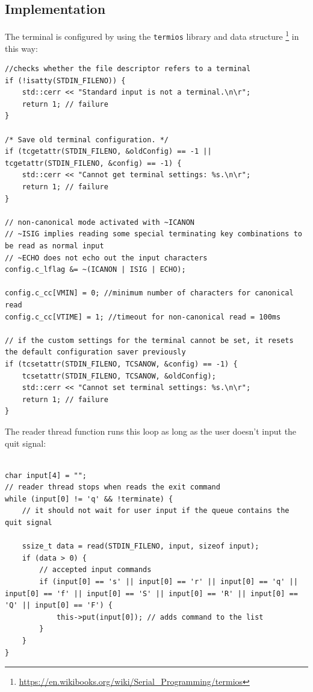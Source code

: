 \documentclass[10pt]{article}
\begin{document}
    \subsection{Implementation}
    The terminal is configured by using the \verb|termios| library and data structure \footnote{\url{https://en.wikibooks.org/wiki/Serial\_Programming/termios}} in this way:
    \begin{verbatim}
//checks whether the file descriptor refers to a terminal
if (!isatty(STDIN_FILENO)) {
	std::cerr << "Standard input is not a terminal.\n\r";
	return 1; // failure
}

/* Save old terminal configuration. */
if (tcgetattr(STDIN_FILENO, &oldConfig) == -1 || tcgetattr(STDIN_FILENO, &config) == -1) {
	std::cerr << "Cannot get terminal settings: %s.\n\r";
	return 1; // failure
}

// non-canonical mode activated with ~ICANON
// ~ISIG implies reading some special terminating key combinations to be read as normal input
// ~ECHO does not echo out the input characters
config.c_lflag &= ~(ICANON | ISIG | ECHO);

config.c_cc[VMIN] = 0; //minimum number of characters for canonical read
config.c_cc[VTIME] = 1; //timeout for non-canonical read = 100ms

// if the custom settings for the terminal cannot be set, it resets the default configuration saver previously
if (tcsetattr(STDIN_FILENO, TCSANOW, &config) == -1) {
	tcsetattr(STDIN_FILENO, TCSANOW, &oldConfig);
	std::cerr << "Cannot set terminal settings: %s.\n\r";
	return 1; // failure
}

    \end{verbatim}

    The reader thread function runs this loop as long as the user doesn't input the quit signal:
    \begin{verbatim}

char input[4] = "";
// reader thread stops when reads the exit command
while (input[0] != 'q' && !terminate) {
	// it should not wait for user input if the queue contains the quit signal

	ssize_t data = read(STDIN_FILENO, input, sizeof input);
	if (data > 0) {
		// accepted input commands
		if (input[0] == 's' || input[0] == 'r' || input[0] == 'q' || input[0] == 'f' || input[0] == 'S' || input[0] == 'R' || input[0] == 'Q' || input[0] == 'F') {
			this->put(input[0]); // adds command to the list
		}
	}
}

    \end{verbatim}
\end{document}

